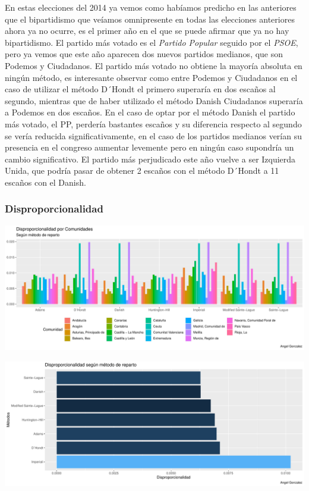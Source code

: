 \documentclass[12pt,a4paper,]{book}
\numberwithin{dummy}{section}
\theoremstyle{ocrenumbox}
\theoremstyle{blacknumex}
\theoremstyle{blacknumbox}
\theoremstyle{ocrenum}
\theoremstyle{ocrenum}
\begin{document}
En estas elecciones del 2014 ya vemos como habíamos predicho en las
anteriores que el bipartidismo que veíamos omnipresente en todas las
elecciones anteriores ahora ya no ocurre, es el primer año en el que se
puede afirmar que ya no hay bipartidismo. El partido más votado es el
\emph{Partido Popular} seguido por el \emph{PSOE}, pero ya vemos que
este año aparecen dos nuevos partidos medianos, que son Podemos y
Ciudadanos. El partido más votado no obtiene la mayoría absoluta en
ningún método, es interesante observar como entre Podemos y Ciudadanos
en el caso de utilizar el método D´Hondt el primero superaría en dos
escaños al segundo, mientras que de haber utilizado el método Danish
Ciudadanos superaría a Podemos en dos escaños. En el caso de optar por
el método Danish el partido más votado, el PP, perdería bastantes
escaños y su diferencia respecto al segundo se vería reducida
significativamente, en el caso de los partidos medianos verían su
presencia en el congreso aumentar levemente pero en ningún caso
supondría un cambio significativo. El partido más perjudicado este año
vuelve a ser Izquierda Unida, que podría pasar de obtener 2 escaños con
el método D´Hondt a 11 escaños con el Danish.

\hypertarget{disproporcionalidad-10}{%
\subsubsection{Disproporcionalidad}\label{disproporcionalidad-10}}

\begin{center}\includegraphics[width=0.95\linewidth]{figurasR/unnamed-chunk-159-1} \end{center}

\begin{center}\includegraphics[width=0.95\linewidth]{figurasR/unnamed-chunk-159-2} \end{center}
\end{document}
